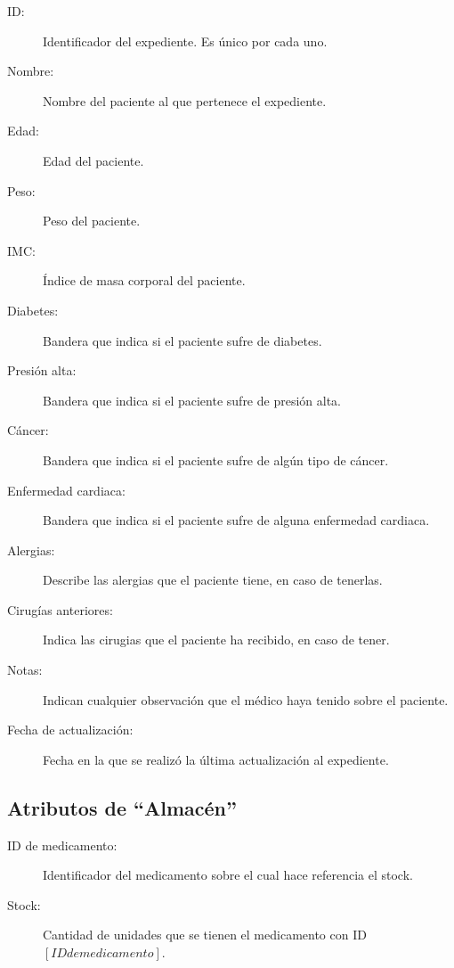 \begin{description}
	\item[ID: ] Identificador del expediente. Es \'unico por cada uno.
	\item[Nombre: ] Nombre del paciente al que pertenece el expediente.
	\item[Edad: ] Edad del paciente.
	\item[Peso: ] Peso del paciente.
	\item[IMC: ] \'Indice de masa corporal del paciente.
	\item[Diabetes: ] Bandera que indica si el paciente sufre de diabetes.
	\item[Presi\'on alta: ] Bandera que indica si el paciente sufre de presi\'on alta.
	\item[C\'ancer: ] Bandera que indica si el paciente sufre de alg\'un tipo de c\'ancer.
	\item[Enfermedad cardiaca: ] Bandera que indica si el paciente sufre de alguna enfermedad cardiaca.
	\item[Alergias: ] Describe las alergias que el paciente tiene, en caso de tenerlas.
	\item[Cirug\'ias anteriores: ] Indica las cirugias que el paciente ha recibido, en caso de tener. 
	\item[Notas: ] Indican cualquier observaci\'on que el m\'edico haya tenido sobre el paciente.
	\item[Fecha de actualizaci\'on: ] Fecha en la que se realiz\'o la \'ultima actualizaci\'on al expediente.
\end{description}

\subsection{Atributos de ``Almac\'en''}

\begin{description}
	\item[ID de medicamento: ] Identificador del medicamento sobre el cual hace referencia el stock.
	\item[Stock: ] Cantidad de unidades que se tienen el medicamento con ID $[ID de medicamento]$.
\end{description}


